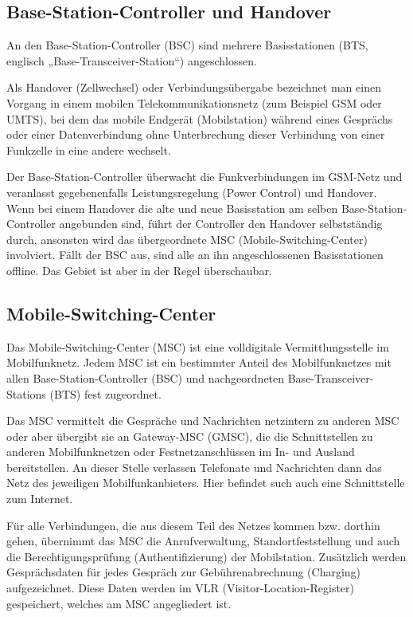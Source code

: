 \documentclass[loesung]{schulein}
\begin{document}
\subsection*{Base-Station-Controller und Handover}
An den Base-Station-Controller (BSC) sind mehrere Basisstationen (BTS, englisch „Base-Transceiver-Station“) angeschlossen. 

Als Handover (Zellwechsel) oder Verbindungsübergabe bezeichnet man einen Vorgang in einem mobilen Telekommunikationsnetz (zum Beispiel GSM oder UMTS), bei dem das mobile Endgerät (Mobilstation) während eines Gesprächs oder einer Datenverbindung ohne Unterbrechung dieser Verbindung von einer Funkzelle in eine andere wechselt.

Der Base-Station-Controller überwacht die Funkverbindungen im GSM-Netz und veranlasst gegebenenfalls Leistungsregelung (Power Control) und  Handover. Wenn bei einem Handover die alte und neue Basisstation am selben Base-Station-Controller angebunden sind, führt der Controller den Handover selbstständig durch, ansonsten wird das übergeordnete MSC (Mobile-Switching-Center) involviert. Fällt der BSC aus, sind alle an ihn angeschlossenen Basisstationen offline. Das Gebiet ist aber in der Regel überschaubar.

\subsection*{Mobile-Switching-Center}
Das Mobile-Switching-Center (MSC) ist eine volldigitale Vermittlungsstelle im Mobilfunknetz. 
Jedem MSC ist ein bestimmter Anteil des Mobilfunknetzes mit allen Base-Station-Controller (BSC) und nachgeordneten Base-Transceiver-Stations (BTS) fest zugeordnet.

Das MSC vermittelt die Gespräche und Nachrichten netzintern zu anderen MSC oder aber übergibt sie an Gateway-MSC (GMSC), die die Schnittstellen zu anderen Mobilfunknetzen oder Festnetzanschlüssen im In- und Ausland bereitstellen. An dieser Stelle verlassen Telefonate und Nachrichten dann das Netz des jeweiligen Mobilfunkanbieters. Hier befindet such auch eine Schnittstelle zum Internet.

Für alle Verbindungen, die aus diesem Teil des Netzes kommen bzw. dorthin gehen, übernimmt das MSC die Anrufverwaltung, Standortfeststellung und auch die Berechtigungsprüfung (Authentifizierung) der Mobilstation. Zusätzlich werden Gesprächsdaten für jedes Gespräch zur Gebührenabrechnung (Charging) aufgezeichnet. Diese Daten werden im VLR (Visitor-Location-Register) gespeichert, welches am MSC angegliedert ist.
\end{document}
